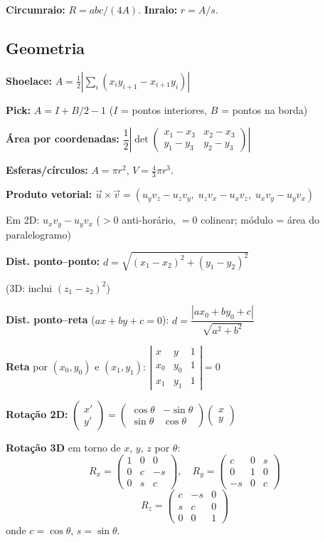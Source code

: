 \textbf{Circumraio:} $R=abc/(4A)$. \quad \textbf{Inraio:} $r=A/s$.

\subsection{Geometria}

\textbf{Shoelace:} $A=\frac12\left|\sum_i(x_iy_{i+1}-x_{i+1}y_i)\right|$

\textbf{Pick:} $A=I+B/2-1$ ($I$ = pontos interiores, $B$ = pontos na borda)

\textbf{Área por coordenadas:} $\dfrac{1}{2}\left|\det\begin{pmatrix}x_1-x_3&x_2-x_3\\y_1-y_3&y_2-y_3\end{pmatrix}\right|$

\textbf{Esferas/círculos:} $A=\pi r^2$, $V=\tfrac43\pi r^3$.

\textbf{Produto vetorial:} $\vec{u}\times\vec{v}=(u_yv_z-u_zv_y,\;u_zv_x-u_xv_z,\;u_xv_y-u_yv_x)$

Em 2D: $u_xv_y-u_yv_x$ ($>0$ anti-horário, $=0$ colinear; módulo = área do paralelogramo)

\textbf{Dist. ponto--ponto:} $d=\sqrt{(x_1-x_2)^2+(y_1-y_2)^2}$

(3D: inclui $(z_1-z_2)^2$)

\textbf{Dist. ponto--reta} ($ax+by+c=0$): $d=\dfrac{|ax_0+by_0+c|}{\sqrt{a^2+b^2}}$

\textbf{Reta} por $(x_0,y_0)$ e $(x_1,y_1)$: $\left|\begin{smallmatrix}x&y&1\\x_0&y_0&1\\x_1&y_1&1\end{smallmatrix}\right|=0$

\textbf{Rotação 2D:} $\begin{pmatrix}x'\\y'\end{pmatrix}=\begin{pmatrix}\cos\theta&-\sin\theta\\\sin\theta&\cos\theta\end{pmatrix}\begin{pmatrix}x\\y\end{pmatrix}$

\textbf{Rotação 3D} em torno de $x$, $y$, $z$ por $\theta$:
\[R_x=\begin{pmatrix}1&0&0\\0&c&-s\\0&s&c\end{pmatrix},\quad
R_y=\begin{pmatrix}c&0&s\\0&1&0\\-s&0&c\end{pmatrix}\]
\[R_z=\begin{pmatrix}c&-s&0\\s&c&0\\0&0&1\end{pmatrix}\]
onde $c=\cos\theta$, $s=\sin\theta$.


